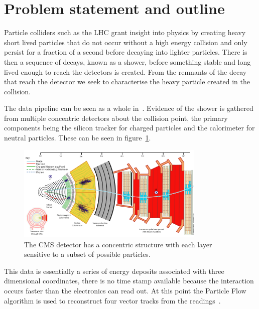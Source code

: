 \section{Problem statement and outline}
Particle colliders such as the LHC grant insight into physics by
creating heavy short lived particles that do not occur without a high energy collision
and only persist for a fraction of a second before decaying into lighter particles.
There is then a sequence of decays, known as a shower, before something
stable and long lived enough to reach the detectors is created.
From the remnants of the decay that reach the detector we seek
to characterise the heavy particle created in the collision.

The data pipeline can be seen as a whole in~\cite{Stoye_DeepCMS2018, Schramm:2291608}.
Evidence of the shower is gathered from multiple concentric detectors about the collision point, the primary components being the 
silicon tracker for charged particles and the calorimeter for neutral particles. 
These can be seen in figure~\ref{fig:lit_CMSdetector}.
\begin{figure}
    \centering
    \includegraphics[width=0.8\textwidth]{images/lit_CMSdetector.png}
    \caption{The CMS detector has a concentric structure with each layer sensitive to a subset of possible particles.
             \cite{Stoye_DeepCMS2018}}
    \label{fig:lit_CMSdetector}
\end{figure}
This data is essentially a series of energy deposits associated with three dimensional coordinates,
there is no time stamp available because the interaction occurs faster than the electronics can read out.
At this point the Particle Flow algorithm is used to reconstruct four vector tracks from the readings~\cite{Beaudette_particleFlow2013}.

